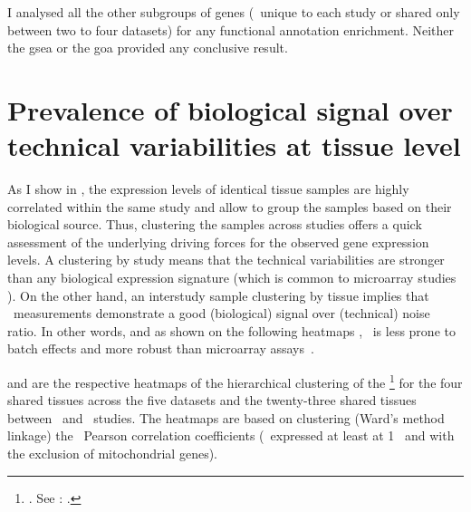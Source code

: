 I analysed all the other subgroups of genes
(\ie\ unique to each study or shared only between two to four datasets)
for any functional annotation enrichment.
Neither the \gls{gsea} or the \gls{goa} provided any conclusive result.

\section{Prevalence of biological signal over technical variabilities at
tissue level}
\label{sec:Trans_ReproExpresTissue}

As I show in ,
the expression levels of identical tissue samples are highly correlated
within the same study
and allow to group the samples based on their biological source.
Thus, clustering the samples across studies offers a quick assessment of
the underlying driving forces for the observed gene expression levels.
A clustering by study means that the technical variabilities are stronger
than any biological expression signature (which is common to microarray studies
).
On the other hand,
an interstudy sample clustering by tissue implies that \Rnaseq\ measurements
demonstrate a good (biological) signal over (technical) noise ratio.
In other words,
and as shown on the following heatmaps ,
\Rnaseq\ is less prone to batch effects and more robust than
microarray assays~.

 and 
are the respective heatmaps of the hierarchical clustering
of the \treps{}\footnote{. See :
.}
for the four shared tissues across the five datasets and the
twenty-three shared tissues between \uhlen\ and \gtex\ studies.
The heatmaps are based on clustering (Ward's method linkage)
the \treps\ Pearson correlation coefficients
(\pcgs\ expressed at least at 1 \FPKM\
and with the exclusion of mitochondrial genes).


